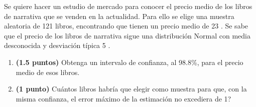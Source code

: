 
Se quiere hacer un estudio de mercado para conocer el precio medio de los libros de narrativa que se venden en la actualidad. Para ello se elige una muestra aleatoria de 121 libros, encontrando que tienen un precio medio de 23 \texteuro{}. Se sabe que el precio de los libros de narrativa sigue una distribución Normal con media desconocida y desviación típica 5 \texteuro{}.
\begin{enumerate}[label=\alph*)]
\item \textbf{(1.5 puntos)} Obtenga un intervalo de confianza, al 98.8\%, para el precio medio de esos libros.
\item \textbf{(1 punto)} \textquestiondown{}Cuántos libros habría que elegir como muestra para que, con la misma confianza, el error máximo de la estimación no excediera de 1\texteuro{}?
\end{enumerate}
